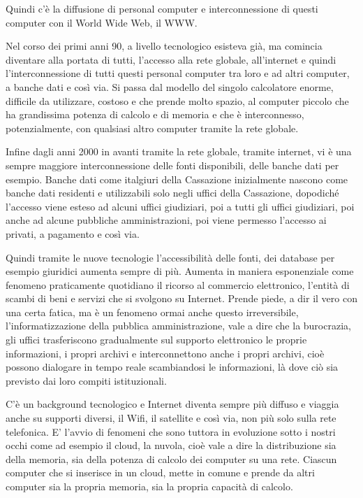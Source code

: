 Quindi c'è la diffusione di personal computer e interconnessione di questi computer con il World Wide Web, il WWW. 

Nel corso dei primi anni 90, a livello tecnologico esisteva già, ma comincia diventare alla portata di tutti, l'accesso alla rete globale, all'internet e quindi l'interconnessione di tutti questi personal computer tra loro e ad altri computer, a banche dati e così via. Si passa dal modello del singolo calcolatore enorme, difficile da utilizzare, costoso e che prende molto spazio, al computer piccolo che ha grandissima potenza di calcolo e di memoria e che è interconnesso, potenzialmente, con qualsiasi altro computer tramite la rete globale.

Infine dagli anni 2000 in avanti tramite la rete globale, tramite internet, vi è una sempre maggiore interconnessione delle fonti disponibili, delle banche dati per esempio. Banche dati come italgiuri della Cassazione inizialmente nascono come banche dati residenti e utilizzabili solo negli uffici della Cassazione, dopodiché l'accesso viene esteso ad alcuni uffici giudiziari, poi a tutti gli uffici giudiziari, poi anche ad alcune pubbliche amministrazioni, poi viene permesso l'accesso ai privati, a pagamento e così via.

Quindi tramite le nuove tecnologie l'accessibilità delle fonti, dei database per esempio giuridici aumenta sempre di più. Aumenta in maniera esponenziale come fenomeno praticamente quotidiano il ricorso al commercio elettronico, l'entità di scambi di beni e servizi che si svolgono su Internet. Prende piede, a dir il vero con una certa fatica, ma è un fenomeno ormai anche questo irreversibile, l'informatizzazione della pubblica amministrazione, vale a dire che la burocrazia, gli uffici trasferiscono gradualmente sul supporto elettronico le proprie informazioni, i propri archivi e interconnettono anche i propri archivi, cioè possono dialogare in tempo reale scambiandosi le informazioni, là dove ciò sia previsto dai loro compiti istituzionali.

C'è un background tecnologico e Internet diventa sempre più diffuso e viaggia anche su supporti diversi, il Wifi, il satellite e così via, non più solo sulla rete telefonica. E' l'avvio di fenomeni che sono tuttora in evoluzione sotto i nostri occhi come ad esempio il cloud, la nuvola, cioè vale a dire la distribuzione sia della memoria, sia della potenza di calcolo dei computer su una rete. Ciascun computer che si inserisce in un cloud, mette in comune e prende da altri computer sia la propria memoria, sia la propria capacità di calcolo.

